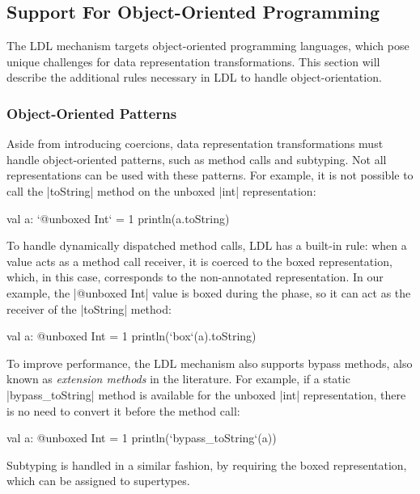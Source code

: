 \subsection{Support For Object-Oriented Programming}
\label{ildl:sec:ldl:oo-patterns}

The LDL mechanism targets object-oriented programming languages, which pose unique challenges for data representation transformations. This section will describe the additional rules necessary in LDL to handle object-orientation.

\subsubsection*{Object-Oriented Patterns}

Aside from introducing coercions, data representation transformations must handle object-oriented patterns, such as method calls and subtyping. Not all representations can be used with these patterns. For example, it is not possible to call the |toString| method on the unboxed |int| representation:

\begin{lstlisting-nobreak}
val a: `@unboxed Int` = 1
println(a.toString)
\end{lstlisting-nobreak}

To handle dynamically dispatched method calls, LDL has a built-in rule: when a value acts as a method call receiver, it is coerced to the boxed representation, which, in this case, corresponds to the non-annotated representation. In our example, the |@unboxed Int| value is boxed during the \coerce{} phase, so it can act as the receiver of the |toString| method:

\begin{lstlisting-nobreak}
val a: @unboxed Int = 1
println(`box`(a).toString)
\end{lstlisting-nobreak}

To improve performance, the LDL mechanism also supports bypass methods, also known as
\emph{extension methods} in the literature. For example, if a static |bypass_toString| method is available for the unboxed |int| representation, there is no need to convert it before the method call:

\begin{lstlisting-nobreak}
val a: @unboxed Int = 1
println(`bypass_toString`(a))
\end{lstlisting-nobreak}

Subtyping is handled in a similar fashion, by requiring the boxed representation, which can be assigned to supertypes.


